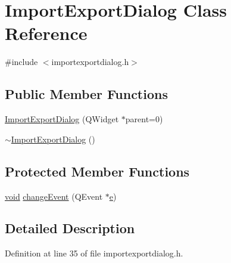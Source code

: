 \hypertarget{class_import_export_dialog}{\section{\-Import\-Export\-Dialog \-Class \-Reference}
\label{class_import_export_dialog}
}


{\ttfamily \#include $<$importexportdialog.\-h$>$}

\subsection*{\-Public \-Member \-Functions}
\begin{DoxyCompactItemize}
\item 
\hyperlink{class_import_export_dialog_a17dc61f63ec24be1769d63152c116f16}{\-Import\-Export\-Dialog} (\-Q\-Widget $\ast$parent=0)
\item 
\hyperlink{class_import_export_dialog_a6cfd90d46c386291e6a6f2d952aa3682}{$\sim$\-Import\-Export\-Dialog} ()
\end{DoxyCompactItemize}
\subsection*{\-Protected \-Member \-Functions}
\begin{DoxyCompactItemize}
\item 
\hyperlink{group___u_a_v_objects_plugin_ga444cf2ff3f0ecbe028adce838d373f5c}{void} \hyperlink{class_import_export_dialog_ada03b1366da59449ce7d8b2e38f7a4b5}{change\-Event} (\-Q\-Event $\ast$\hyperlink{_o_p_plots_8m_a9425be9aab51621e317ba7ade564b570}{e})
\end{DoxyCompactItemize}


\subsection{\-Detailed \-Description}


\-Definition at line 35 of file importexportdialog.\-h.



